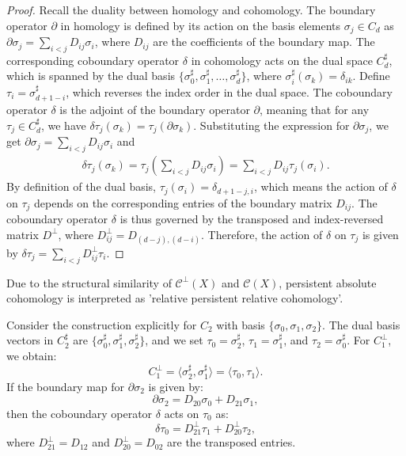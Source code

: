 \begin{proof}
Recall the duality between homology and cohomology. The boundary operator \( \partial \) in homology is defined by its action on the basis elements \( \sigma_j \in C_d \) as $\partial \sigma_j = \sum_{i < j} D_{ij} \sigma_i$, where \( D_{ij} \) are the coefficients of the boundary map. The corresponding coboundary operator \( \delta \) in cohomology acts on the dual space \( C_d^\sharp \), which is spanned by the dual basis \( \{\sigma_0^\sharp, \sigma_1^\sharp, \ldots, \sigma_d^\sharp\} \), where \( \sigma_i^\sharp(\sigma_k) = \delta_{ik} \). Define \( \tau_i = \sigma^\sharp_{d+1-i} \), which reverses the index order in the dual space. The coboundary operator \( \delta \) is the adjoint of the boundary operator \( \partial \), meaning that for any \( \tau_j \in C_d^\sharp \), we have $\delta \tau_j (\sigma_k) = \tau_j(\partial \sigma_k)$. Substituting the expression for \( \partial \sigma_j \), we get $\partial \sigma_j = \sum_{i < j} D_{ij} \sigma_i$ and
\begin{align}
\delta \tau_j (\sigma_k) = \tau_j\left( \sum_{i < j} D_{ij} \sigma_i \right) = \sum_{i < j} D_{ij} \tau_j(\sigma_i).
\end{align}
By definition of the dual basis, \( \tau_j(\sigma_i) = \delta_{d+1-j,i} \), which means the action of \( \delta \) on \( \tau_j \) depends on the corresponding entries of the boundary matrix \( D_{ij} \). The coboundary operator \( \delta \) is thus governed by the transposed and index-reversed matrix \( D^\perp \), where $D_{ij}^\perp = D_{(d-j),(d-i)}$. Therefore, the action of \( \delta \) on \( \tau_j \) is given by $\delta \tau_j = \sum_{i < j} D_{ij}^\perp \tau_i$. \end{proof}

\begin{remark}{\cite[\S 2.7]{de2011dualities}}
Due to the structural similarity of \( \mathcal{C}^\perp(X) \) and \( \mathcal{C}(X) \), persistent absolute cohomology is interpreted as 'relative persistent relative cohomology'.
\end{remark}

\begin{example}
\label{chaincomplexcohomology}
Consider the construction explicitly for \( C_2 \) with basis \( \{\sigma_0, \sigma_1, \sigma_2\} \). The dual basis vectors in \( C_2^\sharp \) are \( \{\sigma_0^\sharp, \sigma_1^\sharp, \sigma_2^\sharp\} \), and we set \( \tau_0 = \sigma_2^\sharp \), \( \tau_1 = \sigma_1^\sharp \), and \( \tau_2 = \sigma_0^\sharp \). For \( C_1^\perp \), we obtain:
\[
	C_1^\perp = \langle \sigma_2^\sharp, \sigma_1^\sharp \rangle = \langle \tau_0, \tau_1 \rangle.
\]
If the boundary map for \( \partial \sigma_2 \) is given by:
\[
	\partial \sigma_2 = D_{20} \sigma_0 + D_{21} \sigma_1,
\]
then the coboundary operator \( \delta \) acts on \( \tau_0 \) as:
\[
	\delta \tau_0 = D_{21}^\perp \tau_1 + D_{20}^\perp \tau_2,
\]
where \( D_{21}^\perp = D_{12} \) and \( D_{20}^\perp = D_{02} \) are the transposed entries.
\end{example}

